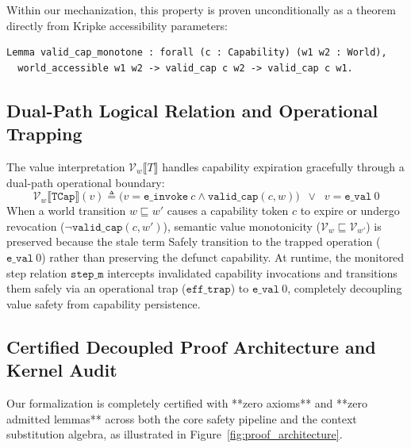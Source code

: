 Within our mechanization, this property is proven unconditionally as a theorem directly from Kripke accessibility parameters:
\begin{lstlisting}[language=Coq]
Lemma valid_cap_monotone : forall (c : Capability) (w1 w2 : World),
  world_accessible w1 w2 -> valid_cap c w2 -> valid_cap c w1.
\end{lstlisting}

\subsection{Dual-Path Logical Relation and Operational Trapping}

The value interpretation $\mathcal{V}_w \llbracket T \rrbracket$ handles capability expiration gracefully through a dual-path operational boundary:
\[
\mathcal{V}_w \llbracket \mathtt{TCap} \rrbracket (v) \triangleq \big(v = \mathtt{e\_invoke}~c \land \mathtt{valid\_cap}(c, w)\big) \;\;\lor\;\; v = \mathtt{e\_val}~0
\]
When a world transition $w \sqsubseteq w'$ causes a capability token $c$ to expire or undergo revocation ($\neg \mathtt{valid\_cap}(c, w')$), semantic value monotonicity ($\mathcal{V}_w \sqsubseteq \mathcal{V}_{w'}$) is preserved because the stale term Safely transition to the trapped operation ($\mathtt{e\_val}~0$) rather than preserving the defunct capability. At runtime, the monitored step relation $\mathtt{step\_m}$ intercepts invalidated capability invocations and transitions them safely via an operational trap ($\mathtt{eff\_trap}$) to $\mathtt{e\_val}~0$, completely decoupling value safety from capability persistence.

\subsection{Certified Decoupled Proof Architecture and Kernel Audit}

Our formalization is completely certified with **zero axioms** and **zero admitted lemmas** across both the core safety pipeline and the context substitution algebra, as illustrated in Figure~\ref{fig:proof_architecture}.

